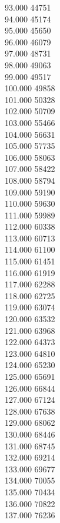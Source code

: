 { 93.000	44751 \\
 94.000	45174 \\
 95.000	45650 \\
 96.000	46079 \\
 97.000	48731 \\
 98.000	49063 \\
 99.000	49517 \\
 100.000	49858 \\
 101.000	50328 \\
 102.000	50709 \\
 103.000	55466 \\
 104.000	56631 \\
 105.000	57735 \\
 106.000	58063 \\
 107.000	58422 \\
 108.000	58794 \\
 109.000	59190 \\
 110.000	59630 \\
 111.000	59989 \\
 112.000	60338 \\
 113.000	60713 \\
 114.000	61100 \\
 115.000	61451 \\
 116.000	61919 \\
 117.000	62288 \\
 118.000	62725 \\
 119.000	63074 \\
 120.000	63532 \\
 121.000	63968 \\
 122.000	64373 \\
 123.000	64810 \\
 124.000	65230 \\
 125.000	65691 \\
 126.000	66844 \\
 127.000	67124 \\
 128.000	67638 \\
 129.000	68062 \\
 130.000	68446 \\
 131.000	68745 \\
 132.000	69214 \\
 133.000	69677 \\
 134.000	70055 \\
 135.000	70434 \\
 136.000	70822 \\
 137.000	76236 \\
}
